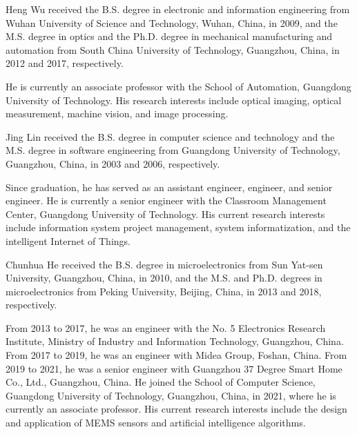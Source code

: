 \documentclass[journal]{IEEEtran}
\begin{document}
\begin{IEEEbiographynophoto}{Heng Wu}
received the B.S. degree in electronic and information engineering from Wuhan University of Science and Technology, Wuhan, China, in 2009, and the M.S. degree in optics and the Ph.D. degree in mechanical manufacturing and automation from South China University of Technology, Guangzhou, China, in 2012 and 2017, respectively.

He is currently an associate professor with the School of Automation, Guangdong University of Technology. His research interests include optical imaging, optical measurement, machine vision, and image processing.
\end{IEEEbiographynophoto}

\begin{IEEEbiographynophoto}{Jing Lin}
received the B.S. degree in computer science and technology and the M.S. degree in software engineering from Guangdong University of Technology, Guangzhou, China, in 2003 and 2006, respectively.

Since graduation, he has served as an assistant engineer, engineer, and senior engineer. He is currently a senior engineer with the Classroom Management Center, Guangdong University of Technology. His current research interests include information system project management, system informatization, and the intelligent Internet of Things.
\end{IEEEbiographynophoto}

\begin{IEEEbiographynophoto}{Chunhua He}
received the B.S. degree in microelectronics from Sun Yat-sen University, Guangzhou, China, in 2010, and the M.S. and Ph.D. degrees in microelectronics from Peking University, Beijing, China, in 2013 and 2018, respectively.

From 2013 to 2017, he was an engineer with the No. 5 Electronics Research Institute, Ministry of Industry and Information Technology, Guangzhou, China. From 2017 to 2019, he was an engineer with Midea Group, Foshan, China. From 2019 to 2021, he was a senior engineer with Guangzhou 37 Degree Smart Home Co., Ltd., Guangzhou, China. He joined the School of Computer Science, Guangdong University of Technology, Guangzhou, China, in 2021, where he is currently an associate professor. His current research interests include the design and application of MEMS sensors and artificial intelligence algorithms.
\end{IEEEbiographynophoto}
\end{document}
